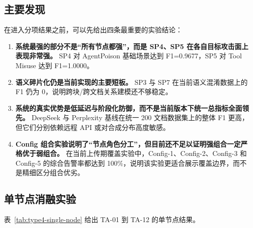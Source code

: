 \documentclass[11pt,a4paper]{ctexart}
\begin{document}
\subsection{主要发现}
在进入分项结果之前，可以先给出四条最重要的实验结论：
\begin{enumerate}[leftmargin=2em]
  \item \textbf{系统最强的部分不是“所有节点都强”，而是 SP4、SP5 在各自目标攻击面上表现非常强。} SP4 对 AgentPoison 基础场景达到 F1=0.9677，SP5 对 Tool Misuse 达到 F1=1.0000。
  \item \textbf{语义碎片化仍是当前实现的主要短板。} SP3 与 SP7 在当前语义混淆数据上的 F1 仍为 0，说明跨块/跨文档关系建模还不够稳定。
  \item \textbf{系统的真实优势是低延迟与阶段化防御，而不是当前版本下统一总指标全面领先。} DeepSeek 与 Perplexity 基线在统一 200 文档数据集上的整体 F1 更高，但它们分别依赖远程 API 或对合成分布高度敏感。
  \item \textbf{Config 组合实验说明了“节点角色分工”，但目前还不足以证明强组合一定严格优于弱组合。} 在当前上传期覆盖实验中，Config-1、Config-2、Config-3 和 Config-5 的综合告警率都达到 100\%，说明该实验更适合展示覆盖边界，而不是精细区分组合优劣。
\end{enumerate}

\subsection{单节点消融实验}
表~\ref{tab:type4-single-node} 给出 TA-01 到 TA-12 的单节点结果。
\end{document}
